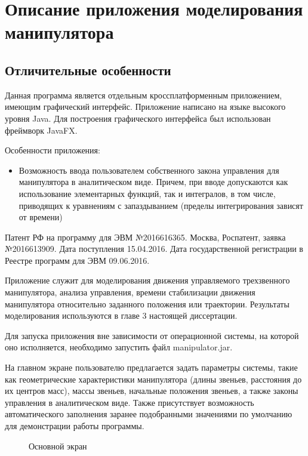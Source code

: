 \newpage
\appendix
\renewcommand{\thechapter}{\Asbuk{chapter}}
\chapter{Описание приложения моделирования манипулятора} 
\section{Отличительные особенности} \label{app1start}

Данная программа является отдельным кроссплатформенным приложением, имеющим графический интерфейс. Приложение написано на языке высокого уровня Java. Для построения графического интерфейса был использован фреймворк JavaFX.

Особенности приложения:
\begin{itemize}
\item{Возможность ввода пользователем собственного закона управления для манипулятора в аналитическом виде. Причем, при вводе допускаются как использование элементарных функций, так и интегралов, в том числе, приводящих к уравнениям с запаздыванием (пределы интегрирования зависят от времени)}
\end{itemize}

Патент РФ на программу для ЭВМ №2016616365. Москва, Роспатент, заявка №2016613909. Дата поступления 15.04.2016. Дата государственной регистрации в Реестре программ для ЭВМ 09.06.2016. 

Приложение служит для моделирования движения управляемого трехзвенного манипулятора, анализа управления, времени стабилизации движения манипулятора относительно заданного положения или траектории. Результаты моделирования используются в главе 3 настоящей диссертации.

Для запуска приложения вне зависимости от операционной системы, на которой оно исполняется, необходимо запустить файл manipulator.jar.

На главном экране пользователю предлагается задать параметры системы, такие как геометрические характеристики манипулятора (длины звеньев, расстояния до их центров масс), массы звеньев, начальные положения звеньев, а также законы управления в аналитическом виде. Также присутствует возможность автоматического заполнения заранее подобранными значениями по умолчанию для демонстрации работы программы.

\begin{figure}[h]
\caption{Основной экран}
\label{ris:modeling}
\end{figure}

